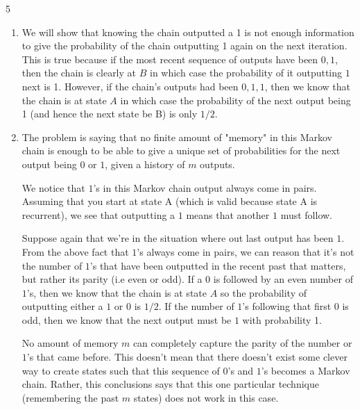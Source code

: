 \documentclass[11.5pt]{article}
\begin{document}
\begin{solution} {5} 
\vspace{-0.5em}
\begin{enumerate}
\item We will show that knowing the chain outputted a 1 is not enough information to give the probability of the chain outputting 1 again on the next iteration. This is true because if the most recent sequence of outputs have been $0,1$, then the chain is clearly at $B$ in which case the probability of it outputting $1$ next is 1. However, if the chain's outputs had been $0,1,1$, then we know that the chain is at state $A$ in which case the probability of the next output being 1 (and hence the next state be B) is only $1/2$. 

\item The problem is saying that no finite amount of "memory" in this Markov chain is enough to be able to give a unique set of probabilities for the next output being $0$ or $1$, given a history of $m$ outputs. 

We notice that $1$'s in this Markov chain output always come in pairs. Assuming that you start at state A (which is valid because state A is recurrent), we see that outputting a $1$ means that another $1$ must follow. 

Suppose again that we're in the situation where out last output has been $1$. From the above fact that $1$'s always come in pairs, we can reason that it's not the number of $1$'s that have been outputted in the recent past that matters, but rather its parity (i.e even or odd). If a 0 is followed by an even number of $1$'s, then we know that the chain is at state $A$ so the probability of outputting either a $1$ or $0$ is $1/2$. If the number of $1$'s following that first $0$ is odd, then we know that the next output must be $1$ with probability 1.  

No amount of memory $m$ can completely capture the parity of the number or $1$'s that came before. This doesn't mean that there doesn't exist some clever way to create states such that this sequence of $0$'s and $1$'s becomes a Markov chain. Rather, this conclusions says that this one particular technique (remembering the past $m$ states) does not work in this case. 

\end{enumerate}
\end{solution}
\end{document}
